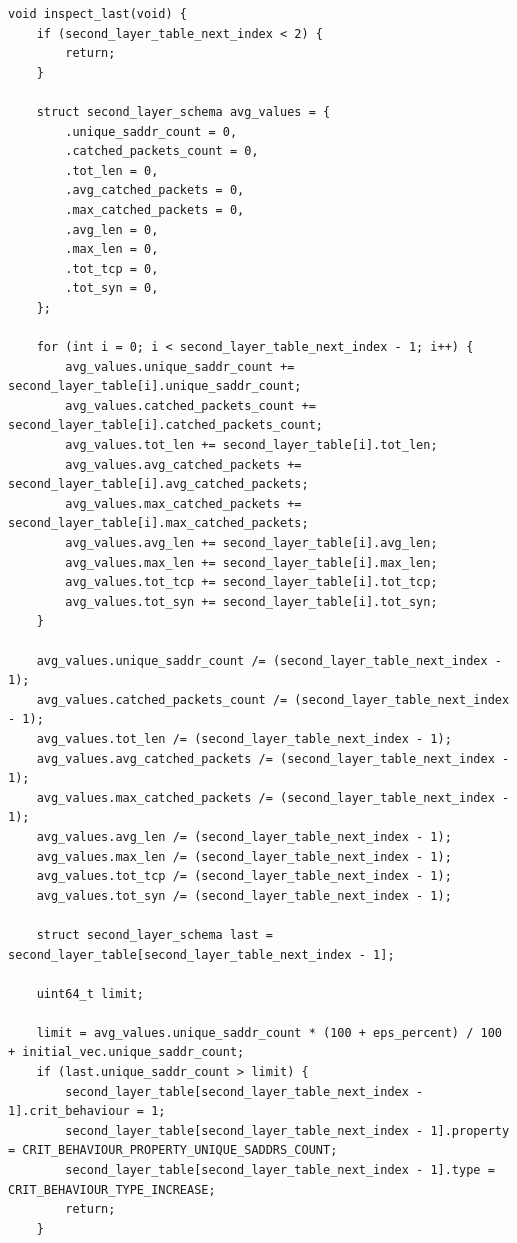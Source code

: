 \documentclass{bmstu}
\begin{document}
\begin{lstlisting}[caption = {Функции обнаружения нестандартного активности во входящем сетевом трафике}, label=lst:anomaly]
void inspect_last(void) {
    if (second_layer_table_next_index < 2) {
        return;
    }

    struct second_layer_schema avg_values = {
        .unique_saddr_count = 0,
        .catched_packets_count = 0,
        .tot_len = 0,
        .avg_catched_packets = 0,
        .max_catched_packets = 0,
        .avg_len = 0,
        .max_len = 0,
        .tot_tcp = 0,
        .tot_syn = 0,
    };

    for (int i = 0; i < second_layer_table_next_index - 1; i++) {
        avg_values.unique_saddr_count += second_layer_table[i].unique_saddr_count;
        avg_values.catched_packets_count += second_layer_table[i].catched_packets_count;
        avg_values.tot_len += second_layer_table[i].tot_len;
        avg_values.avg_catched_packets += second_layer_table[i].avg_catched_packets;
        avg_values.max_catched_packets += second_layer_table[i].max_catched_packets;
        avg_values.avg_len += second_layer_table[i].avg_len;
        avg_values.max_len += second_layer_table[i].max_len;
        avg_values.tot_tcp += second_layer_table[i].tot_tcp;
        avg_values.tot_syn += second_layer_table[i].tot_syn;
    }

    avg_values.unique_saddr_count /= (second_layer_table_next_index - 1);
    avg_values.catched_packets_count /= (second_layer_table_next_index - 1);
    avg_values.tot_len /= (second_layer_table_next_index - 1);
    avg_values.avg_catched_packets /= (second_layer_table_next_index - 1);
    avg_values.max_catched_packets /= (second_layer_table_next_index - 1);
    avg_values.avg_len /= (second_layer_table_next_index - 1);
    avg_values.max_len /= (second_layer_table_next_index - 1);
    avg_values.tot_tcp /= (second_layer_table_next_index - 1);
    avg_values.tot_syn /= (second_layer_table_next_index - 1);

    struct second_layer_schema last = second_layer_table[second_layer_table_next_index - 1];

    uint64_t limit;

    limit = avg_values.unique_saddr_count * (100 + eps_percent) / 100 + initial_vec.unique_saddr_count;
    if (last.unique_saddr_count > limit) {
        second_layer_table[second_layer_table_next_index - 1].crit_behaviour = 1;
        second_layer_table[second_layer_table_next_index - 1].property = CRIT_BEHAVIOUR_PROPERTY_UNIQUE_SADDRS_COUNT;
        second_layer_table[second_layer_table_next_index - 1].type = CRIT_BEHAVIOUR_TYPE_INCREASE;
        return;
    }


\end{lstlisting}
\end{document}
